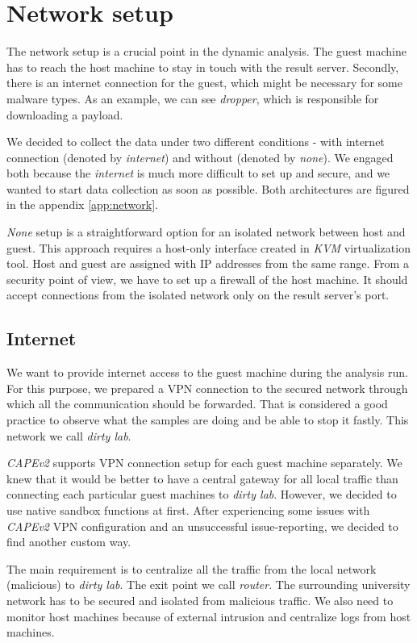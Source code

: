 \section{Network setup}
The network setup is a crucial point in the dynamic analysis. The guest machine has to reach the host machine to stay in touch with the result server. Secondly, there is an internet connection for the guest, which might be necessary for some malware types. As an example, we can see \emph{dropper}, which is responsible for downloading a payload.

We decided to collect the data under two different conditions - with internet connection (denoted by \emph{internet}) and without (denoted by \emph{none}). We engaged both because the \emph{internet} is much more difficult to set up and secure, and we wanted to start data collection as soon as possible. Both architectures are figured in the appendix \ref{app:network}.

\emph{None} setup is a straightforward option for an isolated network between host and guest. This approach requires a host-only interface created in \emph{KVM} virtualization tool. Host and guest are assigned with IP addresses from the same range. From a security point of view, we have to set up a firewall of the host machine. It should accept connections from the isolated network only on the result server's port.

\subsection{Internet}
We want to provide internet access to the guest machine during the analysis run. For this purpose, we prepared a VPN connection to the secured network through which all the communication should be forwarded. That is considered a good practice to observe what the samples are doing and be able to stop it fastly. This network we call \emph{dirty lab}.

\emph{CAPEv2} supports VPN connection setup for each guest machine separately. We knew that it would be better to have a central gateway for all local traffic than connecting each particular guest machines to \emph{dirty lab}. However, we decided to use native sandbox functions at first. After experiencing some issues with \emph{CAPEv2} VPN configuration and an unsuccessful issue-reporting, we decided to find another custom way. 

The main requirement is to centralize all the traffic from the local network (malicious) to \emph{dirty lab}. The exit point we call \emph{router}. The surrounding university network has to be secured and isolated from malicious traffic. We also need to monitor host machines because of external intrusion and centralize logs from host machines.

